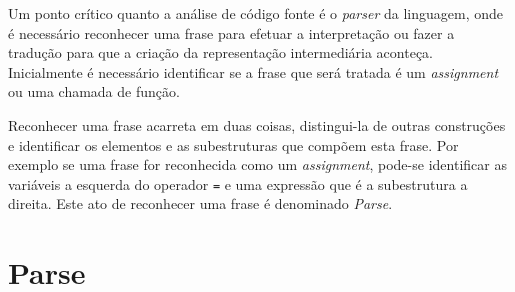 %	
%	
%	





Um ponto crítico quanto a análise de código fonte é o \textit{parser} da linguagem, onde é necessário reconhecer uma frase para efetuar a interpretação ou fazer a tradução para que a criação da representação intermediária aconteça. Inicialmente é necessário identificar se a frase que será tratada é um \textit{assignment} ou uma chamada de função.
 
Reconhecer uma frase acarreta em duas coisas, distingui-la de outras construções e identificar os elementos e as subestruturas que compõem esta frase. Por exemplo se uma frase for reconhecida como um \textit{assignment}, pode-se identificar as variáveis a esquerda do operador \texttt{=} e uma expressão que é a subestrutura a direita. Este ato de reconhecer uma frase é denominado \textit{Parse}.

\section{Parse}

